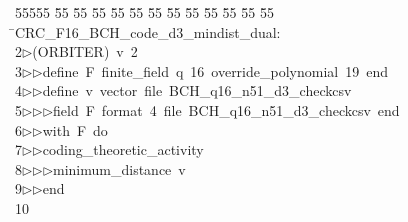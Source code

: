%
%
\begin{tabbing}
55555 \= 55 \= 55 \= 55 \= 55 \= 55 \= 55 \= 55 \= 55 \= 55 \= 55 \= 55 \= 55 \= \>CRC\_F16\_BCH\_code\_d3\_mindist\_dual:\\[0pt]
2\>$\triangleright$\>(ORBITER)\ v\ 2\ \\[0pt]
3\>$\triangleright$\>$\triangleright$\>define\ F\ finite\_field\ q\ 16\ override\_polynomial\ 19\ end\ \\[0pt]
4\>$\triangleright$\>$\triangleright$\>define\ v\ vector\ file\ BCH\_q16\_n51\_d3\_checkcsv\ \\[0pt]
5\>$\triangleright$\>$\triangleright$\>$\triangleright$\>field\ F\ format\ 4\ file\ BCH\_q16\_n51\_d3\_checkcsv\ end\ \\[0pt]
6\>$\triangleright$\>$\triangleright$\>with\ F\ do\ \\[0pt]
7\>$\triangleright$\>$\triangleright$\>coding\_theoretic\_activity\ \\[0pt]
8\>$\triangleright$\>$\triangleright$\>$\triangleright$\>minimum\_distance\ v\ \\[0pt]
9\>$\triangleright$\>$\triangleright$\>end\\[0pt]
10\>\end{tabbing}
